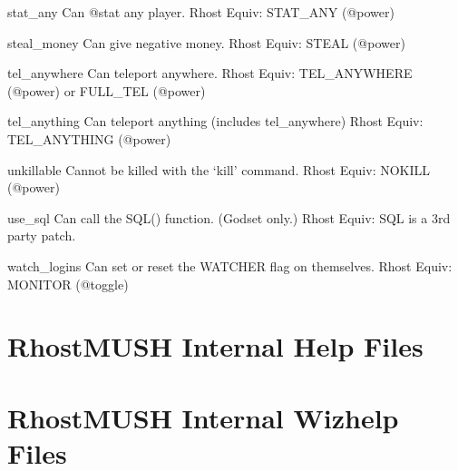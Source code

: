 \documentclass[letterpaper,10pt,english]{sphinxmanual}
\begin{document}
\sphinxAtStartPar
stat\_any              Can @stat any player.
Rhost Equiv: STAT\_ANY (@power)

\sphinxAtStartPar
steal\_money           Can give negative money.
Rhost Equiv: STEAL (@power)

\sphinxAtStartPar
tel\_anywhere          Can teleport anywhere.
Rhost Equiv: TEL\_ANYWHERE (@power) or FULL\_TEL (@power)

\sphinxAtStartPar
tel\_anything          Can teleport anything (includes tel\_anywhere)
Rhost Equiv: TEL\_ANYTHING (@power)

\sphinxAtStartPar
unkillable            Cannot be killed with the ‘kill’ command.
Rhost Equiv: NOKILL (@power)

\sphinxAtStartPar
use\_sql               Can call the SQL() function. (God\sphinxhyphen{}set only.)
Rhost Equiv: SQL is a 3rd party patch.

\sphinxAtStartPar
watch\_logins          Can set or reset the WATCHER flag on themselves.
Rhost Equiv: MONITOR (@toggle)


\section{RhostMUSH Internal Help Files}
\label{\detokenize{helpfile:rhostmush-internal-help-files}}\label{\detokenize{helpfile::doc}}



\section{RhostMUSH Internal Wizhelp Files}
\label{\detokenize{wizhelpfile:rhostmush-internal-wizhelp-files}}\label{\detokenize{wizhelpfile::doc}}
\end{document}
